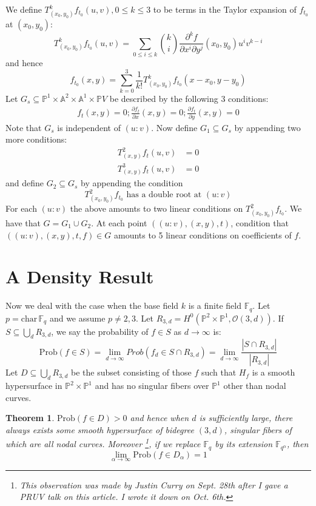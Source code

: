 \documentclass[12pt]{article}
\theoremstyle{plain}
\newtheorem{theorem}[equation]{Theorem}
\theoremstyle{definition}
\newcommand{\IA}{\mathbb{A}}
\newcommand{\IF}{\mathbb{F}}
\newcommand{\IP}{\mathbb{P}}
\newcommand{\sO}{\mathcal{O}}
\newcommand\union{\bigcup}
\newcommand{\<}{\langle}
\renewcommand{\>}{\rangle}
\newcommand{\p}{\partial}
\newcommand{\Prob}{\mathrm{Prob}}
\begin{document}
We define $T^k_{(x_0, y_0)}f_{t_0} (u, v), 0 \le k \le 3$ to be terms in the Taylor expansion of $f_{t_0}$ at $(x_0, y_0)$:
$$ T^k_{(x_0, y_0)}f_{t_0} (u, v) = \sum_{0 \le i \le k} {k \choose i} \frac{\p^k f}{\p x^i \p y^j}(x_0, y_0) u^i v^{k - i} $$
and hence
$$ f_{t_0}(x, y) = \sum_{k = 0}^3 \frac{1}{k!} T^k_{(x_0, y_0)}f_{t_0}(x - x_0, y - y_0) $$
Let $G_s \subseteq \IP^1 \times \IA^2 \times \IA^1 \times \IP V$ be described by the following $3$ conditions:
\begin{align*}
f_t(x , y) = 0 ; 
\frac{\p f_t}{\p x} (x, y) = 0 ; 
\frac{\p f_t}{\p y} (x, y) = 0 
\end{align*}
Note that $G_s$ is independent of $(u : v)$. Now define $G_1 \subseteq G_s$ by appending two more conditions:
\begin{align*}
T^2_{(x, y)}f_{t} (u, v) &= 0 \\
T^3_{(x, y)}f_{t} (u, v) &= 0 
\end{align*}
and define $G_2 \subseteq G_s$ by appending the condition 
$$ T^2_{(x_0, y_0)}f_{t_0} \text{ has a double root at } (u : v) $$
For each $(u : v)$ the above amounts to two linear conditions on $T^2_{(x_0, y_0)}f_{t_0}$. 
We have that $G = G_1 \cup G_2$. 
At each point $((u : v), (x, y), t)$, condition that $((u : v), (x, y), t, f) \in G$ amounts to 5 linear conditions on coefficients of $f$.

\section{A Density Result}
Now we deal with the case when the base field $k$ is a finite field $\IF_q$. Let $p = \mathrm{char}\, \IF_q$ and we assume $p \neq 2, 3$. 
Let $R_{3, d} = H^0(\IP^2 \times \IP^1, \sO(3, d))$. If $S \subseteq \union_d R_{3, d}$, we say the probability of $f \in S$ as $d \to \infty$ is:
$$ \Prob(f \in S) = \lim_{d \to \infty} Prob(f_d \in S \cap R_{3, d}) = \lim_{d \to \infty} \frac{|S \cap R_{3, d}|}{|R_{3, d}|} $$
Let $D \subseteq \union_d R_{3, d}$ be the subset consisting of those $f$ such that $H_f$ is a smooth hypersurface in $\IP^2 \times \IP^1$ and has no singular fibers over $\IP^1$ other than nodal curves. 
\begin{theorem}
$ \Prob(f \in D) > 0 $ and hence when $d$ is sufficiently large, there always exists some smooth hypersurface of bidegree $(3, d)$, singular fibers of which are all nodal curves. Moreover \footnote{This observation was made by Justin Curry on Sept. 28th after I gave a PRUV talk on this article. I wrote it down on Oct. 6th.}, if we replace $\IF_q$ by its extension $\IF_{q^\alpha}$, then $$ \lim_{\alpha \to \infty} \Prob(f \in D_\alpha) = 1$$
\end{theorem}
\end{document}
